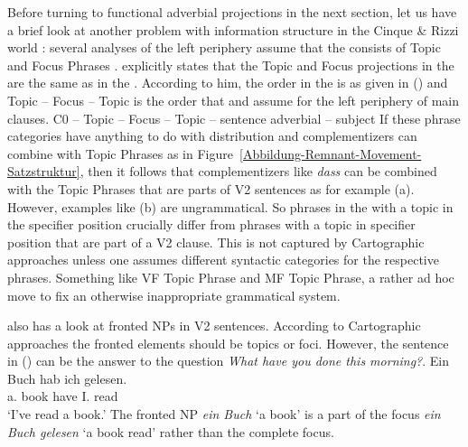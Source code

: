 Before turning to functional adverbial projections in the next section, let us have a brief look at
another problem with information structure in the Cinque \& Rizzi world \citep[]{Rizzi97a-u}: several analyses of the left
periphery assume that the \vf consists of Topic and Focus Phrases \parencites[,
240]{Grewendorf2002a}[, 93]{Grewendorf2005a-u}{Grewendorf2009a}. \citet[]{Grewendorf2005a-u} explicitly states that the Topic and Focus projections in the \mf are the same
as in the \vf. According to him, the order in the \mf is as given in () and Topic – Focus –
Topic is the order that \citet[]{Rizzi97a-u} and \citet[]{Grewendorf2002a} assume for the left periphery of
main clauses. 
\ea
C0 – Topic – Focus – Topic – sentence adverbial – subject
\z
If these phrase categories have anything to do with distribution and complementizers can combine with
Topic Phrases as in Figure~\ref{Abbildung-Remnant-Movement-Satzstruktur}, then it follows that
complementizers like \emph{dass} can be combined with the Topic Phrases that are parts of V2 sentences as for
example (a). However, examples like (b) are ungrammatical.
\eal
{}
\zl
So phrases in the \mf with a topic in the specifier position crucially differ from phrases with a
topic in specifier position that are part of a V2 clause. This is not captured by Cartographic approaches unless one assumes
different syntactic categories for the respective phrases. Something like VF Topic Phrase and MF
Topic Phrase, a rather ad hoc move to fix an otherwise inappropriate grammatical system. 

\citet{Fanselow2006a} also has a look at fronted NPs in V2 sentences. According to Cartographic
approaches the fronted elements should be topics or foci. However, the sentence in () can be
the answer to the question \emph{What have you done this morning?}.
\ea
\gll Ein Buch hab  ich gelesen.\\
     a.\ACC{}   book have I.\NOM{}   read\\\german
\glt `I've read a book.'
\z
The fronted NP \emph{ein Buch} `a book' is a part of the focus \emph{ein Buch gelesen} `a book read'
rather than the complete focus. 

